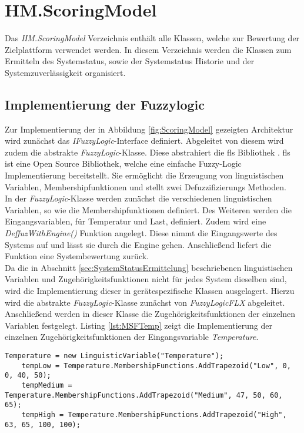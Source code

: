 \section{HM.ScoringModel}
Das \textit{HM.ScoringModel} Verzeichnis enthält alle Klassen, welche zur Bewertung der Zielplattform verwendet werden. In diesem Verzeichnis werden die Klassen zum Ermitteln des Systemstatus, sowie der Systemstatus Historie und der Systemzuverlässigkeit organisiert. 

\subsection{Implementierung der Fuzzylogic}
Zur Implementierung der in Abbildung \ref{fig:ScoringModel} gezeigten Architektur wird zunächst das \textit{IFuzzyLogic}-Interface definiert. Abgeleitet von diesem wird zudem die abstrakte \textit{FuzzyLogic}-Klasse. Diese abstrahiert die \ac{fls} Bibliothek \cite{FLSGit}. \ac{fls} ist eine Open Source Bibliothek, welche eine einfache Fuzzy-Logic Implementierung bereitstellt. Sie ermöglicht die Erzeugung von linguistischen Variablen, Membershipfunktionen und stellt zwei Defuzzifizierungs Methoden.\\
In der \textit{FuzzyLogic}-Klasse werden zunächst die verschiedenen linguistischen Variablen, so wie die Membershipfunktionen definiert. Des Weiteren werden die Eingangsvariablen, für Temperatur und Last, definiert. 
Zudem wird eine \textit{DeffuzWithEngine()} Funktion angelegt. Diese nimmt die Eingangswerte des Systems auf und lässt sie durch die Engine gehen. Anschließend liefert die Funktion eine Systembewertung zurück.\\
Da die in Abschnitt \ref{sec:SystemStatusErmittelung} beschriebenen linguistischen Variablen und Zugehörigkeitsfunktionen nicht für jedes System dieselben sind, wird die Implementierung dieser in gerätespezifische Klassen ausgelagert. Hierzu wird die abstrakte \textit{FuzzyLogic}-Klasse zunächst von \textit{FuzzyLogicFLX} abgeleitet. Anschließend werden in dieser Klasse die Zugehörigkeitsfunktionen der einzelnen Variablen festgelegt. Listing \ref{lst:MSFTemp} zeigt die Implementierung der einzelnen Zugehörigkeitsfunktionen der Eingangsvariable \textit{Temperature}.\\
\begin{lstlisting}[caption={Implementierung der Zugehörigkeitsfunktionen zur Eingangsvariable \textit{Temperature}}, label={lst:MSFTemp}]
    Temperature = new LinguisticVariable("Temperature");
    tempLow = Temperature.MembershipFunctions.AddTrapezoid("Low", 0, 0, 40, 50);
    tempMedium = Temperature.MembershipFunctions.AddTrapezoid("Medium", 47, 50, 60, 65);
    tempHigh = Temperature.MembershipFunctions.AddTrapezoid("High", 63, 65, 100, 100);
\end{lstlisting}
